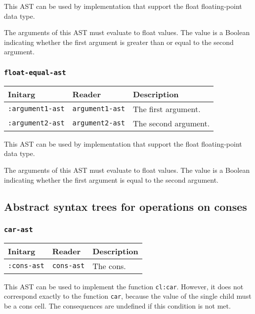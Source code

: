 This AST can be used by implementation that support the float
floating-point data type.  

The arguments of this AST must evaluate to float
values.  The value is a Boolean indicating whether the first argument
is greater than or equal to the second argument.

\subsubsection{\texttt{float-equal-ast}}
\label{sec-ast-float-equal}

\begin{tabular}{|l|l|l|}
\hline
Initarg & Reader & Description\\
\hline\hline
\texttt{:argument1-ast} & \texttt{argument1-ast} & The first argument.\\
\hline
\texttt{:argument2-ast} & \texttt{argument2-ast} & The second argument.\\
\hline
\end{tabular}

This AST can be used by implementation that support the float
floating-point data type.  

The arguments of this AST must evaluate to float
values.  The value is a Boolean indicating whether the first argument
is equal to the second argument.

\subsection{Abstract syntax trees for operations on conses}

\subsubsection{\texttt{car-ast}}
\label{sec-ast-car}

\begin{tabular}{|l|l|l|}
  \hline
  Initarg & Reader & Description\\
  \hline\hline
  \texttt{:cons-ast} & \texttt{cons-ast} & The cons.\\
  \hline
\end{tabular}

This AST can be used to implement the function \texttt{cl:car}. However,
it does not correspond exactly to the function \texttt{car}, because
the value of the single child must be a cons cell. The consequences
are undefined if this condition is not met.

